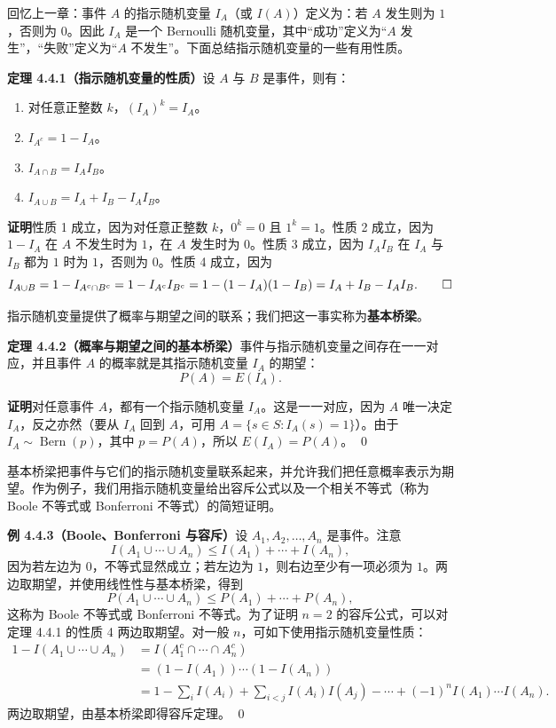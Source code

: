 \documentclass[UTF8,12pt,a4paper,fontset=fandol]{ctexart}
\begin{document}
回忆上一章：事件 $A$ 的指示随机变量 $I_A$（或 $I(A)$）定义为：若 $A$ 发生则为 $1$，否则为 $0$。因此 $I_A$ 是一个 Bernoulli 随机变量，其中“成功”定义为“$A$ 发生”，“失败”定义为“$A$ 不发生”。下面总结指示随机变量的一些有用性质。

\noindent\textbf{定理 4.4.1（指示随机变量的性质）}\quad 设 $A$ 与 $B$ 是事件，则有：
\begin{enumerate}
  \item 对任意正整数 $k$，$(I_A)^k=I_A$。
  \item $I_{A^c}=1-I_A$。
  \item $I_{A\cap B}=I_AI_B$。
  \item $I_{A\cup B}=I_A+I_B-I_AI_B$。
\end{enumerate}

\noindent\textbf{证明}\quad 性质 1 成立，因为对任意正整数 $k$，$0^k=0$ 且 $1^k=1$。性质 2 成立，因为 $1-I_A$ 在 $A$ 不发生时为 $1$，在 $A$ 发生时为 $0$。性质 3 成立，因为 $I_AI_B$ 在 $I_A$ 与 $I_B$ 都为 $1$ 时为 $1$，否则为 $0$。性质 4 成立，因为
\[
  I_{A\cup B}
  =1-I_{A^c\cap B^c}
  =1-I_{A^c}I_{B^c}
  =1-(1-I_A)(1-I_B)
  =I_A+I_B-I_AI_B. \qed
\]

指示随机变量提供了概率与期望之间的联系；我们把这一事实称为\textbf{基本桥梁}。

\noindent\textbf{定理 4.4.2（概率与期望之间的基本桥梁）}\quad 事件与指示随机变量之间存在一一对应，并且事件 $A$ 的概率就是其指示随机变量 $I_A$ 的期望：
\[
  P(A)=E(I_A).
\]

\noindent\textbf{证明}\quad 对任意事件 $A$，都有一个指示随机变量 $I_A$。这是一一对应，因为 $A$ 唯一决定 $I_A$，反之亦然（要从 $I_A$ 回到 $A$，可用 $A=\{s\in S:I_A(s)=1\}$）。由于 $I_A\sim\operatorname{Bern}(p)$，其中 $p=P(A)$，所以 $E(I_A)=P(A)$。 \qed

基本桥梁把事件与它们的指示随机变量联系起来，并允许我们把任意概率表示为期望。作为例子，我们用指示随机变量给出容斥公式以及一个相关不等式（称为 Boole 不等式或 Bonferroni 不等式）的简短证明。

\noindent\textbf{例 4.4.3（Boole、Bonferroni 与容斥）}\quad 设 $A_1,A_2,\ldots,A_n$ 是事件。注意
\[
  I(A_1\cup\cdots\cup A_n)\le I(A_1)+\cdots+I(A_n),
\]
因为若左边为 $0$，不等式显然成立；若左边为 $1$，则右边至少有一项必须为 $1$。两边取期望，并使用线性性与基本桥梁，得到
\[
  P(A_1\cup\cdots\cup A_n)\le P(A_1)+\cdots+P(A_n),
\]
这称为 Boole 不等式或 Bonferroni 不等式。为了证明 $n=2$ 的容斥公式，可以对定理 4.4.1 的性质 4 两边取期望。对一般 $n$，可如下使用指示随机变量性质：
\[
\begin{aligned}
  1-I(A_1\cup\cdots\cup A_n)
  &=I(A_1^c\cap\cdots\cap A_n^c) \\
  &=(1-I(A_1))\cdots(1-I(A_n)) \\
  &=1-\sum_i I(A_i)+\sum_{i<j}I(A_i)I(A_j)-\cdots
    +(-1)^n I(A_1)\cdots I(A_n).
\end{aligned}
\]
两边取期望，由基本桥梁即得容斥定理。 \qed
\end{document}
